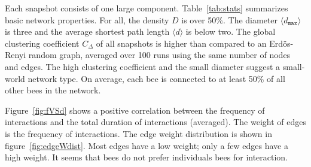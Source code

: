 Each snapshot consists of one large component.
Table~\ref{tab:stats} summarizes basic network properties.
For all, the density $D$ is over 50\%.
The diameter $\langle d_{\texttt{max}} \rangle$ is three and the average shortest path length $\langle d \rangle$ is below two.
The global clustering coefficient $C_\Delta$ of all snapshots is higher than compared to an Erdös-Renyi random graph, averaged over 100 runs using the same number of nodes and edges.
The high clustering coefficient and the small diameter suggest a small-world network type.
On average, each bee is connected to at least 50\% of all other bees in the network.

Figure~\ref{fig:fVSd} shows a positive correlation between the frequency of interactions and the total duration of interactions (averaged).
 The weight of edges is the frequency of interactions.
The edge weight distribution is shown in figure~\ref{fig:edgeWdist}.
Most edges have a low weight; only a few edges have a high weight.
It seems that bees do not prefer individuals bees for interaction.



